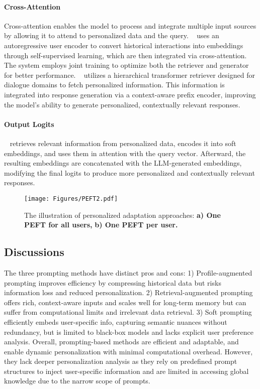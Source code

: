 \paragraph{Cross-Attention}
Cross-attention enables the model to process and integrate multiple input sources by allowing it to attend to personalized data and the query. 
~\citep{ning2024user} uses an autoregressive user encoder to convert historical interactions into embeddings through self-supervised learning, which are then integrated via cross-attention. The system employs joint training to optimize both the retriever and generator for better performance.
~\citep{liu2023recap} utilizes a hierarchical transformer retriever designed for dialogue domains to fetch personalized information. This information is integrated into response generation via a context-aware prefix encoder, improving the model's ability to generate personalized, contextually relevant responses. 

\paragraph{Output Logits}

~\citep{wu2021personalized} retrieves relevant information from personalized data, encodes it into soft embeddings, and uses them in attention with the query vector. Afterward, the resulting embeddings are concatenated with the LLM-generated embeddings, modifying the final logits to produce more personalized and contextually relevant responses.


\begin{figure*}[!t]
    \centering
    \texttt{[image: Figures/PEFT2.pdf]}
    \caption{The illustration of personalized adaptation approaches: \textbf{a) One PEFT for all users,} \textbf{b) One PEFT per user.}  }
    \label{fig:peft}
\vspace{-8pt}
\end{figure*}


\subsection{Discussions}

The three prompting methods have distinct pros and cons: 1) Profile-augmented prompting improves efficiency by compressing historical data but risks information loss and reduced personalization. 2) Retrieval-augmented prompting offers rich, context-aware inputs and scales well for long-term memory but can suffer from computational limits and irrelevant data retrieval.  3) Soft prompting efficiently embeds user-specific info, capturing semantic nuances without redundancy, but is limited to black-box models and lacks explicit user preference analysis.
Overall, prompting-based methods are efficient and adaptable, and enable dynamic personalization with minimal computational overhead.
However, they lack deeper personalization analysis as they rely on predefined prompt structures to inject user-specific information and are limited in accessing global knowledge due to the narrow scope of prompts.

